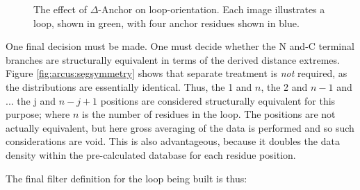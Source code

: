 \begin{figure}[hbtp]
\begin{center}
\quad
{}
\end{center}
\caption[The effect of $\Delta$-Anchor on loop-orientation]{The effect of $\Delta$-Anchor on loop-orientation. Each image illustrates a  loop, shown in green, with four anchor residues shown in blue.}
\label{fig:arcus:segmaxmin}
\end{figure}

One final decision must be made. One must decide whether the N and-C terminal branches are structurally equivalent in terms of the derived distance extremes. Figure \ref{fig:arcus:segsymmetry} shows that separate treatment is \emph{not} required, as the distributions are essentially identical. Thus, the 1 and $n$, the 2 and $n-1$ and  ... the j and $n-j+1$ positions are considered structurally equivalent for this purpose; where $n$ is the number of residues in the loop. The positions are not actually equivalent, but here gross averaging of the data is performed and so such considerations are void. This is also advantageous, because it doubles the data density within the pre-calculated database for each residue position.

The final filter definition for the loop being built is thus:

